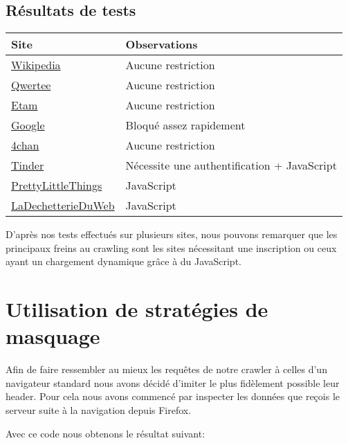 \documentclass[hideweeklyreports,noposter]{polytech/polytech}
\begin{document}
		\section{Résultats de tests}
			\begin{center}
				\centering
				\begin{tabularx}{\textwidth}{|X|X|}
					\hline
					Site & Observations\\\hline
					\href{https://en.wikipedia.org/wiki/Main_Page}{Wikipedia} & Aucune restriction\\\hline
					\href{https://www.qwertee.com/}{Qwertee} & Aucune restriction\\\hline
					\href{https://www.etam.com/}{Etam} & Aucune restriction\\\hline
					\href{https://www.google.com/}{Google} & Bloqué assez rapidement\\\hline
					\href{https://www.4chan.org/}{4chan} & Aucune restriction\\\hline
					\href{https://tinder.com/}{Tinder} & Nécessite une authentification + JavaScript\\\hline
					\href{https://www.prettylittlethings.fr/}{PrettyLittleThings} & JavaScript\\\hline
					\href{https://www.ladechetterieduweb.com/}{LaDechetterieDuWeb} & JavaScript\\\hline
				\end{tabularx}
			\end{center}
			
			D'après nos tests effectués sur plusieurs sites, nous pouvons remarquer que les principaux freins au crawling sont les sites nécessitant une inscription ou ceux ayant un chargement dynamique grâce à du JavaScript.
	
	\chapter{Utilisation de stratégies de masquage}
		Afin de faire ressembler au mieux les requêtes de notre crawler à celles d'un navigateur standard nous avons décidé d'imiter le plus fidèlement possible leur header.
		Pour cela nous avons commencé par inspecter les données que reçois le serveur suite à la navigation depuis Firefox.
		
		
		Avec ce code nous obtenons le résultat suivant:
			
\end{document}
